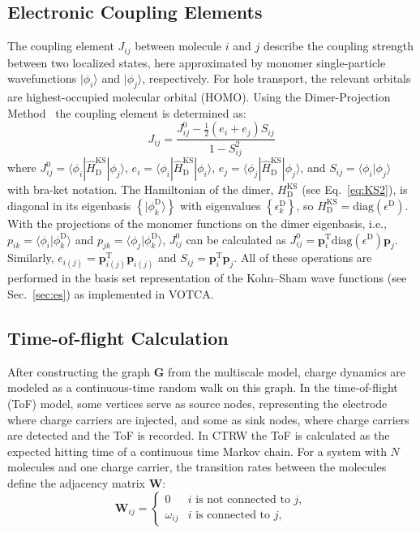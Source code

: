 \documentclass[%
 reprint,
superscriptaddress,
 amsmath,amssymb,
 aps,
prb,
floatfix
]{revtex4-2}
\begin{document}
\subsection{Electronic Coupling Elements}
The coupling element $J_{ij}$ between molecule $i$ and $j$ describe the coupling strength between two localized states, here approximated by monomer single-particle wavefunctions $\vert \phi_i\rangle$ and $\vert\phi_j\rangle$, respectively. For hole transport, the relevant orbitals are highest-occupied molecular orbital (HOMO). Using the Dimer-Projection Method~\cite{baumeier_density_2010} the coupling element is determined as:
%
\begin{equation}
    J_{ij} = \frac{ J^0_{ij}- \frac{1}{2}(e_i+e_j) S_{ij} }{ 1- S_{ij}^2 }
    \label{equ:JAB}
\end{equation}
%
where $J^0_{ij} = \langle \phi_i | \hat{H}^\text{KS}_\text{D} | \phi_j \rangle $, $e_i = \langle \phi_i | \hat{H}^\text{KS}_\text{D} | \phi_i \rangle $, $e_j = \langle \phi_j | \hat{H}^\text{KS}_\text{D} | \phi_j \rangle $, and $S_{ij}=\langle \phi_i | \phi_j \rangle $ with bra-ket notation. The Hamiltonian of the dimer,  $H^\text{KS}_\text{D}$ (see Eq.~\ref{eq:KS2}), is diagonal in its eigenbasis $\left\{\vert \phi^\text{D}_k\rangle\right\}$ with eigenvalues $\left\{ \epsilon^\text{D}_k\right\}$, so $H^\text{KS}_\text{D} = \text{diag}(\epsilon^\text{D})$. With the projections of the monomer functions on the dimer eigenbasis, i.e., $p_{ik} = \langle \phi_i | \phi^\text{D}_k \rangle$ and  $p_{jk} = \langle \phi_j | \phi^\text{D}_k \rangle$, $J^0_{ij}$ can be calculated as $J^0_{ij} = \mathbf{p}_i^\text{T} \text{diag}(\epsilon^\text{D}) \mathbf{p}_j$. Similarly, $e_{i(j)} = \mathbf{p}_{i(j)}^\text{T} \mathbf{p}_{i(j)}$ and $S_{ij} =  \mathbf{p}_i^\text{T} \mathbf{p}_j$. All  of these operations are performed in the basis set representation of the Kohn--Sham wave functions (see Sec.~\ref{sec:es}) as implemented in VOTCA.

\subsection{Time-of-flight Calculation}
After constructing the  graph $\mathbf{G}$ from the multiscale model, charge dynamics are modeled as a continuous-time random walk on this graph. In the time-of-flight (ToF) model, some vertices serve as source nodes, representing the electrode where charge carriers are injected, and some as sink nodes, where charge carriers are detected and the ToF is recorded. In CTRW the ToF is calculated as the expected hitting time of a continuous time Markov chain. For a system with $N$ molecules and one charge carrier, the transition rates between the molecules define the adjacency matrix $\mathbf{W}$:
%
\begin{equation}
  \label{eq:transition_rates}
	\mathbf{W}_{ij} =
	\begin{cases}
	     0			&  i \text{ is not connected to } j,\\
         \omega_{ij}   &  i \text{ is connected to } j,
	\end{cases}
\end{equation}
\end{document}
